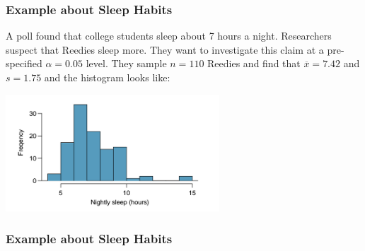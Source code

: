 \documentclass[handout]{beamer}
\newcommand{\blue}[1]{\textcolor{blue2}{#1}}
\newcommand{\xbar}{\overline{x}}
\begin{document}
\begin{frame}
\frametitle{Example about Sleep Habits}
A poll found that college students sleep about 7 hours a night.  Researchers suspect that Reedies sleep more.   They want to investigate this claim at a pre-specified $\alpha=0.05$ level.  \pause They sample $n=110$ Reedies and find that $\xbar = 7.42$ and $s=1.75$ and the histogram looks like:

\begin{center}
\includegraphics[width=0.6\textwidth]{figure/sleep.png}
\end{center}



%

\end{frame}


\begin{frame}
\frametitle{Example about Sleep Habits}


\end{frame}
\end{document}
